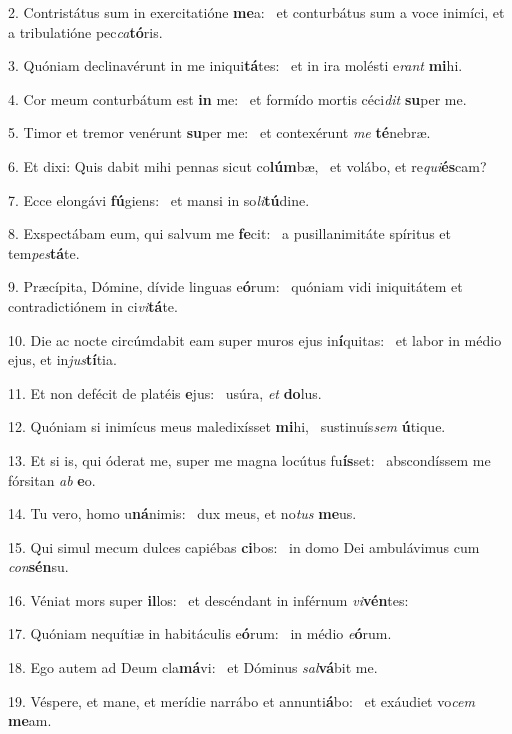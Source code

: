 2. Contristátus sum in exercitatióne \textbf{me}a: \ast\  et conturbátus sum a voce inimíci, et a tribulatióne pec\textit{ca}\textbf{tó}ris.\

3. Quóniam declinavérunt in me iniqui\textbf{tá}tes: \ast\  et in ira molésti e\textit{rant} \textbf{mi}hi.\

4. Cor meum conturbátum est \textbf{in} me: \ast\  et formído mortis céci\textit{dit} \textbf{su}per me.\

5. Timor et tremor venérunt \textbf{su}per me: \ast\  et contexérunt \textit{me} \textbf{té}nebræ.\

6. Et dixi: Quis dabit mihi pennas sicut co\textbf{lúm}bæ, \ast\  et volábo, et re\textit{qui}\textbf{és}cam?\

7. Ecce elongávi \textbf{fú}giens: \ast\  et mansi in so\textit{li}\textbf{tú}dine.\

8. Exspectábam eum, qui salvum me \textbf{fe}cit: \ast\  a pusillanimitáte spíritus et tem\textit{pes}\textbf{tá}te.\

9. Præcípita, Dómine, dívide linguas e\textbf{ó}rum: \ast\  quóniam vidi iniquitátem et contradictiónem in ci\textit{vi}\textbf{tá}te.\

10. Die ac nocte circúmdabit eam super muros ejus in\textbf{í}quitas: \ast\  et labor in médio ejus, et in\textit{jus}\textbf{tí}tia.\

11. Et non defécit de platéis \textbf{e}jus: \ast\  usúra, \textit{et} \textbf{do}lus.\

12. Quóniam si inimícus meus maledixísset \textbf{mi}hi, \ast\  sustinuís\textit{sem} \textbf{ú}tique.\

13. Et si is, qui óderat me, super me magna locútus fu\textbf{ís}set: \ast\  abscondíssem me fórsitan \textit{ab} \textbf{e}o.\

14. Tu vero, homo u\textbf{ná}nimis: \ast\  dux meus, et no\textit{tus} \textbf{me}us.\

15. Qui simul mecum dulces capiébas \textbf{ci}bos: \ast\  in domo Dei ambulávimus cum \textit{con}\textbf{sén}su.\

16. Véniat mors super \textbf{il}los: \ast\  et descéndant in inférnum \textit{vi}\textbf{vén}tes:\

17. Quóniam nequítiæ in habitáculis e\textbf{ó}rum: \ast\  in médio \textit{e}\textbf{ó}rum.\

18. Ego autem ad Deum cla\textbf{má}vi: \ast\  et Dóminus \textit{sal}\textbf{vá}bit me.\

19. Véspere, et mane, et merídie narrábo et annunti\textbf{á}bo: \ast\  et exáudiet vo\textit{cem} \textbf{me}am.\

